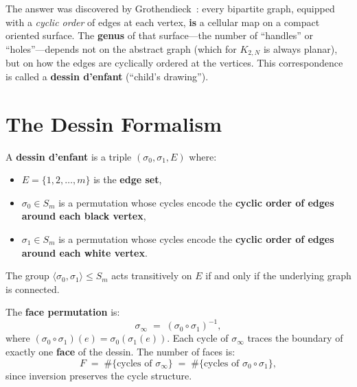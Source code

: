 The answer was discovered by Grothendieck~\cite{grothendieck1984}:
every bipartite graph, equipped with a \emph{cyclic order} of edges
at each vertex, \textbf{is} a cellular map on a compact oriented
surface. The \textbf{genus} of that surface---the number of
``handles'' or ``holes''---depends not on the abstract graph (which for
$K_{2,N}$ is always planar), but on how the edges are cyclically
ordered at the vertices. This correspondence is called a
\textbf{dessin d'enfant} (``child's drawing'').

\section{The Dessin Formalism}
\label{sec:dessins-formalismo}

\begin{definition}
\label{def:dessin}
A \textbf{dessin d'enfant} is a triple $(\sigma_0, \sigma_1, E)$
where:
\begin{itemize}
  \item $E = \{1, 2, \ldots, m\}$ is the \textbf{edge set},
  \item $\sigma_0 \in S_m$ is a permutation whose cycles encode the
        \textbf{cyclic order of edges around each black vertex},
  \item $\sigma_1 \in S_m$ is a permutation whose cycles encode the
        \textbf{cyclic order of edges around each white vertex}.
\end{itemize}
The group $\langle \sigma_0, \sigma_1 \rangle \le S_m$ acts
transitively on $E$ if and only if the underlying graph is connected.
\end{definition}

\begin{definition}
\label{def:perm-caras}
The \textbf{face permutation} is:
\[
  \sigma_\infty \;=\; (\sigma_0 \circ \sigma_1)^{-1},
\]
where $(\sigma_0 \circ \sigma_1)(e) = \sigma_0(\sigma_1(e))$. Each
cycle of $\sigma_\infty$ traces the boundary of exactly one
\textbf{face} of the dessin. The number of faces is:
\[
  F \;=\; \#\{\text{cycles of } \sigma_\infty\}
    \;=\; \#\{\text{cycles of } \sigma_0 \circ \sigma_1\},
\]
since inversion preserves the cycle structure.
\end{definition}

